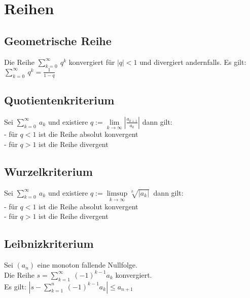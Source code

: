 \documentclass[german]{latex4ei/latex4ei_sheet}
\begin{document}
\section{Reihen}

\begin{sectionbox}
	\subsection{Geometrische Reihe}
	Die Reihe $\sum \limits_{k=0}^{\infty}\ q^k$ konvergiert für $|q|<1$ und divergiert andernfalls. Es gilt:\\
	$\sum \limits_{k=0}^{\infty}\ q^k = \frac{1}{1-q}$ 

\end{sectionbox}

\begin{sectionbox}
	\subsection{Quotientenkriterium}
	Sei $\sum \limits_{k=0}^{\infty}\ a_k$ und existiere 
	$q := \lim\limits_{k \to \infty} |\frac{a_{k+1}}{a_k}| $ dann gilt: \\
	- für $q<1$ ist die Reihe absolut konvergent\\
	- für $q>1$ ist die Reihe divergent

\end{sectionbox}

\begin{sectionbox}
	\subsection{Wurzelkriterium}
	
		Sei $\sum \limits_{k=0}^{\infty}\ a_k$ und existiere 
	$q := \limsup \limits_{k \to \infty} \sqrt[k]{|a_k|}\ $ dann gilt: \\
	- für $q<1$ ist die Reihe absolut konvergent\\
	- für $q>1$ ist die Reihe divergent

\end{sectionbox}

\begin{sectionbox}
	\subsection{Leibnizkriterium}
	Sei $(a_n)$ eine monoton fallende Nullfolge.\\Die  Reihe $s = \sum \limits_{k=1}^{\infty}\ (-1)^{k-1} a_k$ konvergiert.\\	
	Es gilt: $|s - \sum \limits_{k=1}^{n}\ (-1)^{k-1} a_k| \le a_{n+1}$
		

	

\end{sectionbox}
\end{document}

